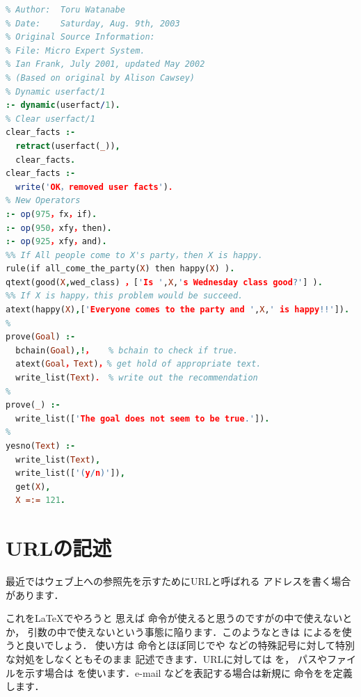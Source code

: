 \bgroup
\narrowbaselines
\begin{lstlisting}[framerule=.4pt,caption={Prologのソースコードを\Y{Listings}を使って挿入する例},label=src:prolog,language={Prolog}]
% File:    prolog.pl 
% Author:  Toru Watanabe 
% Date:    Saturday, Aug. 9th, 2003 
% Original Source Information: 
% File: Micro Expert System.
% Ian Frank, July 2001, updated May 2002 
% (Based on original by Alison Cawsey) 
% Dynamic userfact/1 
:- dynamic(userfact/1).
% Clear userfact/1
clear_facts :-                     
  retract(userfact(_)),
  clear_facts.
clear_facts :-                     
  write('OK，removed user facts')．
% New Operators
:- op(975，fx，if).
:- op(950，xfy，then).
:- op(925，xfy，and).
%% If All people come to X's party，then X is happy.
rule(if all_come_the_party(X) then happy(X) ).
qtext(good(X,wed_class) ，['Is ',X,'s Wednesday class good?'] ).
%% If X is happy，this problem would be succeed.
atext(happy(X),['Everyone comes to the party and ',X,' is happy!!']).
% 
prove(Goal) :-
  bchain(Goal),!，   % bchain to check if true.
  atext(Goal，Text)，% get hold of appropriate text.
  write_list(Text)． % write out the recommendation
%
prove(_) :- 
  write_list(['The goal does not seem to be true.']).
%
yesno(Text) :-
  write_list(Text),
  write_list(['(y/n)']),
  get(X),
  X =:= 121.  
\end{lstlisting}
\egroup




\section{URLの記述\zdash{}}

\par \widebaselines

最近ではウェブ上への参照先を示すためにURLと呼ばれる
アドレスを書く場合があります．

これを{\LaTeX}でやろうと
思えば 命令が使えると思うのですがの中で使えないとか，
引数の中で使えないという事態に陥ります．このようなときは
によるを使うと良いでしょう．
使い方は 命令とほぼ同じで\qu{\texttt\%}や\qu{\texttt\#}
などの特殊記号に対して特別な対処をしなくともそのまま
記述できます．URLに対しては を，
パスやファイルを示す場合は を使います．e-mail
などを表記する場合は新規に 命令をを定義します．

\begin{InTeX}
\newcommand{\email}{\begingroup \urlstyle{rm}\Url}
\end{InTeX}

